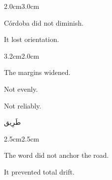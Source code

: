 \begin{center}
\end{center}

\vspace{3em}

\begin{adjustwidth}{2.0cm}{3.0cm}

Córdoba did not diminish.

\medskip

It lost orientation.

\vspace{3em}

\end{adjustwidth}


\vspace{2em}

\begin{adjustwidth}{3.2cm}{2.0cm}

The margins widened.

\medskip

Not evenly.

\medskip

Not reliably.

\vspace{2em}


\vspace{3em}

\end{adjustwidth}

\begin{center}
\begin{AR}
طَرِيق
\end{AR}
\end{center}

\vspace{3em}

\begin{adjustwidth}{2.5cm}{2.5cm}

The word did not anchor the road.

\medskip

It prevented total drift.

\vspace{3em}

\end{adjustwidth}

